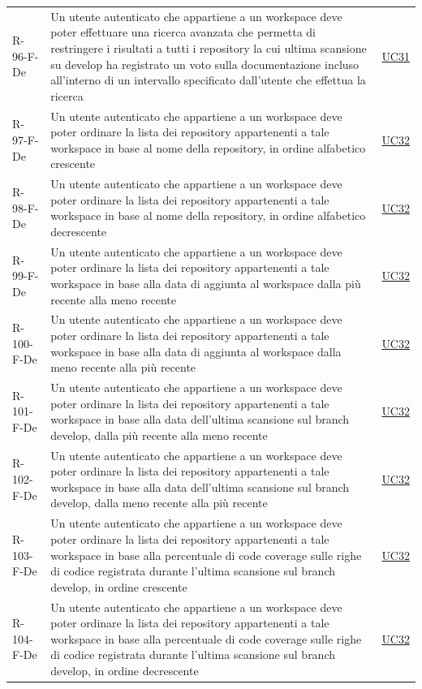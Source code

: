 \documentclass[a4paper, 11pt]{article}
\begin{document}
\begin{longtable}[c]{ >{\centering\arraybackslash}m{2.5cm} >{\centering\arraybackslash}m{8.3cm} >{\centering\arraybackslash}m{3.5cm} }
    R-96-F-De & Un utente autenticato che appartiene a un workspace deve poter effettuare una ricerca avanzata che permetta di restringere i risultati a tutti i repository la cui ultima scansione su develop ha registrato un voto sulla documentazione incluso all'interno di un intervallo specificato dall'utente che effettua la ricerca & \hyperref[UC31]{UC31}\\
    R-97-F-De & Un utente autenticato che appartiene a un workspace deve poter ordinare la lista dei repository appartenenti a tale workspace in base al nome della repository, in ordine alfabetico crescente & \hyperref[UC32]{UC32}\\
    R-98-F-De & Un utente autenticato che appartiene a un workspace deve poter ordinare la lista dei repository appartenenti a tale workspace in base al nome della repository, in ordine alfabetico decrescente & \hyperref[UC32]{UC32}\\
    R-99-F-De & Un utente autenticato che appartiene a un workspace deve poter ordinare la lista dei repository appartenenti a tale workspace in base alla data di aggiunta al workspace dalla più recente alla meno recente & \hyperref[UC32]{UC32}\\
    R-100-F-De & Un utente autenticato che appartiene a un workspace deve poter ordinare la lista dei repository appartenenti a tale workspace in base alla data di aggiunta al workspace dalla meno recente alla più recente & \hyperref[UC32]{UC32}\\
    R-101-F-De & Un utente autenticato che appartiene a un workspace deve poter ordinare la lista dei repository appartenenti a tale workspace in base alla data dell'ultima scansione sul branch develop, dalla più recente alla meno recente & \hyperref[UC32]{UC32}\\
    R-102-F-De & Un utente autenticato che appartiene a un workspace deve poter ordinare la lista dei repository appartenenti a tale workspace in base alla data dell'ultima scansione sul branch develop, dalla meno recente alla più recente & \hyperref[UC32]{UC32}\\
    R-103-F-De & Un utente autenticato che appartiene a un workspace deve poter ordinare la lista dei repository appartenenti a tale workspace in base alla percentuale di code coverage sulle righe di codice registrata durante l'ultima scansione sul branch develop, in ordine crescente & \hyperref[UC32]{UC32}\\
    R-104-F-De & Un utente autenticato che appartiene a un workspace deve poter ordinare la lista dei repository appartenenti a tale workspace in base alla percentuale di code coverage sulle righe di codice registrata durante l'ultima scansione sul branch develop, in ordine decrescente & \hyperref[UC32]{UC32}\\

\end{longtable}
\end{document}
